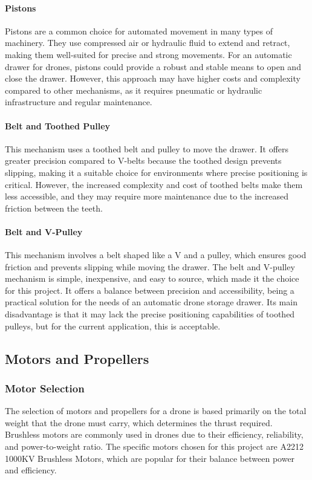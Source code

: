     \paragraph{Pistons} Pistons are a common choice for automated movement in many types of machinery. They use compressed air or hydraulic fluid to extend and retract, making them well-suited for precise and strong movements. For an automatic drawer for drones, pistons could provide a robust and stable means to open and close the drawer. However, this approach may have higher costs and complexity compared to other mechanisms, as it requires pneumatic or hydraulic infrastructure and regular maintenance.
    
    \paragraph{Belt and Toothed Pulley} This mechanism uses a toothed belt and pulley to move the drawer. It offers greater precision compared to V-belts because the toothed design prevents slipping, making it a suitable choice for environments where precise positioning is critical. However, the increased complexity and cost of toothed belts make them less accessible, and they may require more maintenance due to the increased friction between the teeth.
    
    \paragraph{Belt and V-Pulley} This mechanism involves a belt shaped like a V and a pulley, which ensures good friction and prevents slipping while moving the drawer. The belt and V-pulley mechanism is simple, inexpensive, and easy to source, which made it the choice for this project. It offers a balance between precision and accessibility, being a practical solution for the needs of an automatic drone storage drawer. Its main disadvantage is that it may lack the precise positioning capabilities of toothed pulleys, but for the current application, this is acceptable.

\subsection{Motors and Propellers}
    \subsubsection{Motor Selection}
    The selection of motors and propellers for a drone is based primarily on the total weight that the drone must carry, which determines the thrust required. Brushless motors are commonly used in drones due to their efficiency, reliability, and power-to-weight ratio. The specific motors chosen for this project are A2212 1000KV Brushless Motors, which are popular for their balance between power and efficiency.
    
